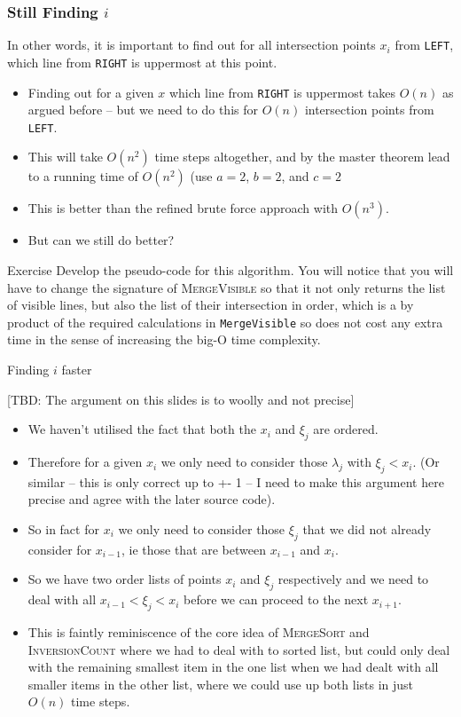 \documentclass{article}
\begin{document}
\begin{frame}
  \frametitle{Still Finding $i$}
  In other words, it is important to find out for all intersection
  points $x_i$ from \texttt{LEFT}, which line from \texttt{RIGHT} is
  uppermost at this point.
  \begin{itemize}
  \item Finding out for a given $x$ which line from \texttt{RIGHT} is
    uppermost takes $O(n)$ as argued before -- but we need to do this
    for $O(n)$ intersection points from \texttt{LEFT}. 
  \item This will take $O(n^2)$ time steps altogether, and by the
    master theorem lead to a running time of $O(n^2)$ (use $a=2$,
    $b=2$, and $c = 2$
  \item This is better than the refined brute force approach with
    $O(n^3)$.
  \item But can we still do better?
  \end{itemize}
  \begin{block}{Exercise}
    Develop the pseudo-code for this algorithm. You will notice that
    you will have to change the signature of \textsc{MergeVisible} so
    that it not only returns the list of visible lines, but also the
    list of their intersection in order, which is a by product of the
    required calculations in \texttt{MergeVisible} so does not cost
    any extra time in the sense of increasing the big-O time complexity.
  \end{block}
\end{frame}

\begin{frame}{Finding $i$ faster}

  [TBD: The argument on this slides is to woolly and not precise]
  \begin{itemize}
  \item We haven't utilised the fact that both the $x_i$ and $\xi_j$
    are ordered. 
  \item Therefore for a given $x_i$ we only need to consider those
    $\lambda_j$ with $\xi_j < x_i$. (Or similar -- this is only
    correct up to +- 1 -- I need to make this argument here precise and
    agree with the later source code).
  \item So in fact for $x_i$ we only need to consider those $\xi_j$ that we did
    not already consider for $x_{i-1}$, ie those that are between
    $x_{i-1}$ and $x_{i}$.
  \item So we have two order lists of points $x_i$ and $\xi_j$
    respectively and we need to deal with all $x_{i-1} < \xi_j < x_i$
    before we can proceed to the next $x_{i+1}$.
  \item This is faintly reminiscence of the core idea of
    \textsc{MergeSort} and \textsc{InversionCount} where we had to
    deal with to sorted list, but could only deal with the remaining
    smallest item in the one list when we had dealt with all smaller
    items in the other list, where we could use up both lists in just
    $O(n)$ time steps.
  \end{itemize}
\end{frame}
\end{document}
